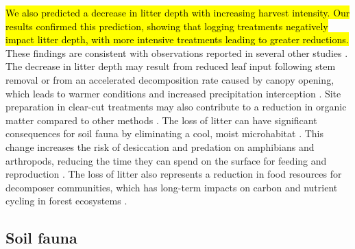 \hl{We also predicted a decrease in litter depth with increasing harvest intensity. 
Our results confirmed this prediction, showing that logging treatments negatively impact litter depth, with more intensive treatments leading to greater reductions. }
These findings are consistent with observations reported in several other studies \citep{Marshall2000Impactsforest,Mazerolle2021Woodlandsalamander}. 
The decrease in litter depth may result from reduced leaf input following stem removal or from an accelerated decomposition rate caused by canopy opening, 
which leads to warmer conditions and increased precipitation interception \citep{Fierer2005LitterQuality,Butenschoen2011Interactiveeffects,Ameray2021Forestcarbon}. 
Site preparation in clear-cut treatments may also contribute to a reduction in organic matter compared to other methods \citep{Prevost1992Effetsscarifiage}. 
The loss of litter can have significant consequences for soil fauna by eliminating a cool, moist microhabitat \citep{spotilaRoleTemperatureWater1972,groverInfluenceCoverMoisture1998a,Niemela2007effectsforestry}. 
This change increases the risk of desiccation and predation on amphibians and arthropods, reducing the time they can spend on the surface for feeding and reproduction \citep{deMaynadier1995relationshipforest,koivula.LeafLitterSmallscale1999,Walton2013Topdownregulation}. 
The loss of litter also represents a reduction in food resources for decomposer communities, which has long-term impacts on carbon and nutrient cycling in forest ecosystems \citep{Handa2014Consequencesbiodiversity}. 



\subsection*{Soil fauna}
\label{disc:soil_fauna}



